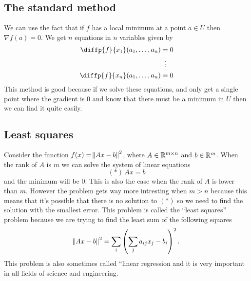 \documentclass[11pt,a4paper]{article}
\begin{document}
\subsection{The standard method}
We can use the fact that if $f$ has a local minimum at a point $a \in U$ then
$\nabla f(a) = 0$.
We get $n$ equations in $n$ variables given by
\begin{align*}
  \diffp{f}{{x_1}}(a_1,\dots,a_n) &= 0 \\
                                  &\vdotswithin{=} \\
  \diffp{f}{{x_n}}(a_1,\dots,a_n) &= 0
\end{align*}
This method is good because if we solve these equations, and only get a single
point where the gradient is $0$ and know that there must be a minimum in $U$
then we can find it quite easily.

\subsection{Least squares}
Consider the function $f(x) = \norm{Ax - b}^2$, where $A \in \mathbb{R}^{m \times n}$
and $b \in \mathbb{R}^m$.
When the rank of $A$ is $m$ we can solve the system of linear equations
\[
  (*)\,Ax = b
\]
and the minimum will be $0$.
This is also the case when the rank of $A$ is lower than $m$.
However the problem gets way more intresting when $m > n$ because this means
that it's possible that there is no solution to $(*)$ so we need to find
the solution with the smallest error.
This problem is called the ``least squares'' problem because we are trying
to find the least sum of the following squares
\[
  \norm{Ax - b}^2 = \sum_{i}\del{\sum_{j} a_{ij} x_{j} - b_{i}}^2.
\]
This problem is also sometimes called ``linear regression and it is very
important in all fields of science and engineering.
\end{document}
